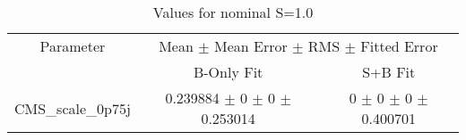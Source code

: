 \begin{table}
\centering
\caption{Values for nominal S=1.0}
\begin{tabular}{ccc}
\toprule
Parameter & \multicolumn{2}{c}{Mean $\pm$ Mean Error $\pm$ RMS $\pm$ Fitted Error}\\
 & B-Only Fit & S+B Fit\\
\midrule
CMS\_scale\_0p75j & \num{0.239884} $\pm$ \num{0} $\pm$ \num{0} $\pm$ \num{0.253014} & \num{0} $\pm$ \num{0} $\pm$ \num{0} $\pm$ \num{0.400701}\\
\bottomrule
\end{tabular}
\end{table}